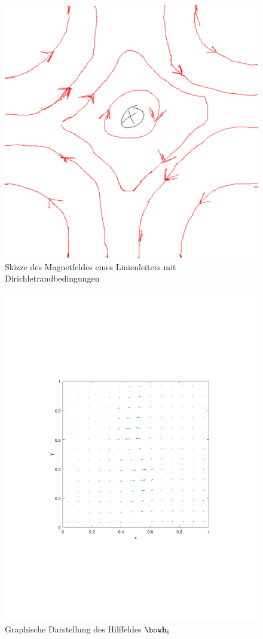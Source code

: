 \documentclass[Protokollheft.tex]{subfiles}
\begin{document}
\begin{figure}
	\centering
	\includegraphics[width=0.5\linewidth]{DirichletRand}
	\caption{Skizze des Magnetfeldes eines Linienleiters mit Dirichletrandbedingungen}
	\label{fig:dirichletrand}
\end{figure}
\begin{figure}[ht]
	\centering
	\includegraphics[width=0.8\linewidth]{Plot_der_hilffelders.pdf}
	\caption{Graphische Darstellung des Hilffeldes $\hfit_{\text{i}}$ }
	\label{fig:hilffeld}
\end{figure}
\end{document}
